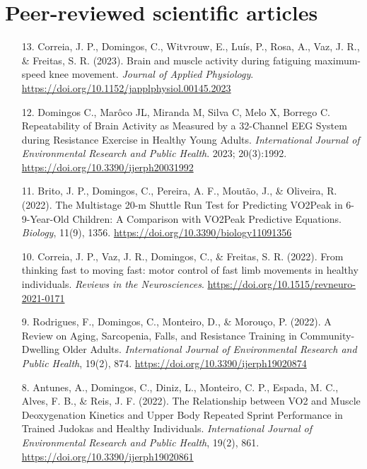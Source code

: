 \section*{Peer-reviewed scientific articles}
\begin{enumerate}

  \item[13.] Correia, J. P., Domingos, C., Witvrouw, E., Luís, P., Rosa, A., Vaz, J. R., \& Freitas, S. R. (2023). Brain and muscle activity during fatiguing maximum-speed knee movement.
  \emph{Journal of Applied Physiology}.
  \url{https://doi.org/10.1152/japplphysiol.00145.2023}
  
  \item[12.] Domingos C., Marôco JL, Miranda M, Silva C, Melo X, Borrego C. Repeatability of Brain Activity as Measured by a 32-Channel EEG System during Resistance Exercise in Healthy Young Adults.
  \emph{International Journal of Environmental Research and Public Health}. 2023; 20(3):1992.
  \url{https://doi.org/10.3390/ijerph20031992}

  \item[11.] Brito, J. P., Domingos, C., Pereira, A. F., Moutão, J., \& Oliveira, R. (2022). The Multistage 20-m Shuttle Run Test for Predicting VO2Peak in 6-9-Year-Old Children: A Comparison with VO2Peak Predictive 
  Equations.
  \emph{Biology}, 11(9), 1356.
  \url{https://doi.org/10.3390/biology11091356}

  \item[10.] Correia, J. P., Vaz, J. R., Domingos, C., \& Freitas, S. R. (2022). From thinking fast to moving fast: motor control of fast limb movements in healthy individuals.
  \emph{Reviews in the Neurosciences}.
  \url{https://doi.org/10.1515/revneuro-2021-0171}

  \item[9.] Rodrigues, F., Domingos, C., Monteiro, D., \& Morouço, P. (2022). A Review on Aging, Sarcopenia, Falls, and Resistance Training in Community-Dwelling Older Adults.
  \emph{International Journal of Environmental Research and Public Health}, 19(2), 874.
  \url{https://doi.org/10.3390/ijerph19020874}

  \item[8.] Antunes, A., Domingos, C., Diniz, L., Monteiro, C. P., Espada, M. C., Alves, F. B., \& Reis, J. F. (2022). The Relationship between VO2 and Muscle Deoxygenation Kinetics and Upper Body Repeated Sprint 
  Performance in Trained Judokas and Healthy Individuals.
  \emph{International Journal of Environmental Research and Public Health}, 19(2), 861.
  \url{https://doi.org/10.3390/ijerph19020861}


\end{enumerate}
